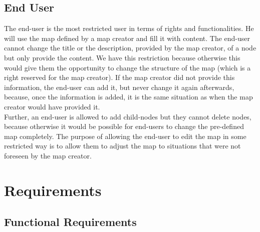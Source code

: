 \subsection{End User}\label{sec:user-class-end-user}
The end-user is the most restricted user in terms of rights and functionalities. He will use the map defined by a map creator and fill it with content. The end-user cannot change the title or the description, provided by the map creator, of a node but only provide the content. We have this restriction because otherwise this would give them the opportunity to change the structure of the map (which is a right reserved for the map creator). If the map creator did not provide this information, the end-user can add it, but never change it again afterwards, because, once the information is added, it is the same situation as when the map creator would have provided it.\\

Further, an end-user is allowed to add child-nodes but they cannot delete nodes, because otherwise it would be possible for end-users to change the pre-defined map completely. The purpose of allowing the end-user to edit the map in some restricted way is to allow them to adjust the map to situations that were not foreseen by the map creator.



\section{Requirements}\label{sec:requirements}

\subsection{Functional Requirements}\label{sec:functional-requirements}

